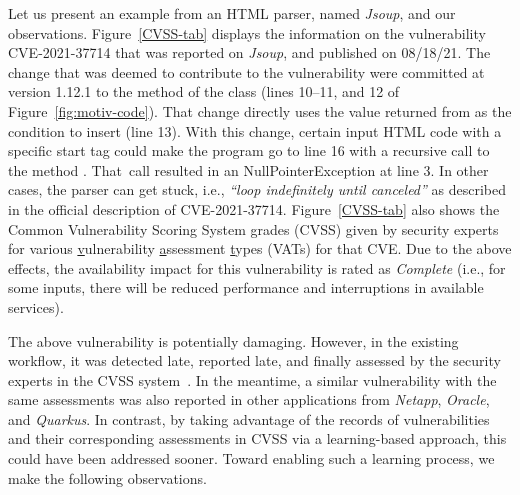 

Let us present an example from an HTML parser, named {\em Jsoup}, and
our observations. Figure~\ref{CVSS-tab} displays the information on
the vulnerability CVE-2021-37714 that was reported on {\em Jsoup}, and
published on 08/18/21. The change that was deemed to contribute to the
vulnerability were committed at version 1.12.1 to the method
 of the
 class (lines 10--11, and 12 of
Figure~\ref{fig:motiv-code}). That change directly uses the value
returned from  as the condition to
insert  (line 13). With this change, certain input HTML
code with a specific start tag could make the program go to line 16
with a recursive call to the method . That~call
resulted in an NullPointerException at line 3.
In other cases, the parser can get stuck, i.e., {\em ``loop
  indefinitely until canceled''} as described in the official
description of CVE-2021-37714. Figure~\ref{CVSS-tab} also shows the
Common Vulnerability Scoring System grades (CVSS) given by security
experts for various \underline{v}ulnerability \underline{a}ssessment
\underline{t}ypes (VATs) for that CVE. Due to the above effects, the
availability impact for this vulnerability is rated as {\em Complete}
(i.e., for some inputs, there will be reduced performance and
interruptions in available services).

The above vulnerability is potentially damaging. However, in the existing workflow, it was detected late, reported late, and finally assessed by the security experts in the CVSS system~\cite{first-website}. In the meantime, a similar vulnerability with the same assessments was also reported in other applications from {\em Netapp}, {\em Oracle}, and {\em Quarkus}. In contrast, by taking advantage of the records of vulnerabilities and their corresponding assessments in CVSS via a learning-based approach, this could have been addressed sooner. Toward enabling such a learning process, we make the following observations.

